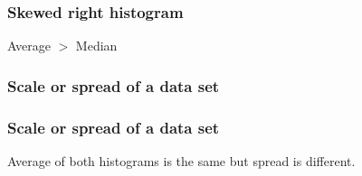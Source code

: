 \documentclass[handout]{beamer}
\begin{document}
   \begin{frame} \frametitle{Skewed right histogram}

   \begin{figure}
   \centering

   \end{figure}
   \begin{center}
   Average $>$ Median
   \end{center}
   \end{frame}



   \begin{frame}
   \frametitle{Scale or spread of a data set}
   \begin{center}
   \end{center}

   \end{frame}



   \begin{frame}
   \frametitle{Scale or spread of a data set}
   \begin{center}
   \end{center}
   Average of both histograms is the same but spread is different.
   \end{frame}
\end{document}
